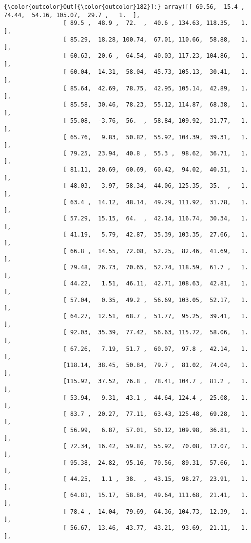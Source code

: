 \documentclass[11pt]{article}
\begin{document}
\begin{Verbatim}[commandchars=\\\{\}]
{\color{outcolor}Out[{\color{outcolor}182}]:} array([[ 69.56,  15.4 ,  74.44,  54.16, 105.07,  29.7 ,   1.  ],
                 [ 89.5 ,  48.9 ,  72.  ,  40.6 , 134.63, 118.35,   1.  ],
                 [ 85.29,  18.28, 100.74,  67.01, 110.66,  58.88,   1.  ],
                 [ 60.63,  20.6 ,  64.54,  40.03, 117.23, 104.86,   1.  ],
                 [ 60.04,  14.31,  58.04,  45.73, 105.13,  30.41,   1.  ],
                 [ 85.64,  42.69,  78.75,  42.95, 105.14,  42.89,   1.  ],
                 [ 85.58,  30.46,  78.23,  55.12, 114.87,  68.38,   1.  ],
                 [ 55.08,  -3.76,  56.  ,  58.84, 109.92,  31.77,   1.  ],
                 [ 65.76,   9.83,  50.82,  55.92, 104.39,  39.31,   1.  ],
                 [ 79.25,  23.94,  40.8 ,  55.3 ,  98.62,  36.71,   1.  ],
                 [ 81.11,  20.69,  60.69,  60.42,  94.02,  40.51,   1.  ],
                 [ 48.03,   3.97,  58.34,  44.06, 125.35,  35.  ,   1.  ],
                 [ 63.4 ,  14.12,  48.14,  49.29, 111.92,  31.78,   1.  ],
                 [ 57.29,  15.15,  64.  ,  42.14, 116.74,  30.34,   1.  ],
                 [ 41.19,   5.79,  42.87,  35.39, 103.35,  27.66,   1.  ],
                 [ 66.8 ,  14.55,  72.08,  52.25,  82.46,  41.69,   1.  ],
                 [ 79.48,  26.73,  70.65,  52.74, 118.59,  61.7 ,   1.  ],
                 [ 44.22,   1.51,  46.11,  42.71, 108.63,  42.81,   1.  ],
                 [ 57.04,   0.35,  49.2 ,  56.69, 103.05,  52.17,   1.  ],
                 [ 64.27,  12.51,  68.7 ,  51.77,  95.25,  39.41,   1.  ],
                 [ 92.03,  35.39,  77.42,  56.63, 115.72,  58.06,   1.  ],
                 [ 67.26,   7.19,  51.7 ,  60.07,  97.8 ,  42.14,   1.  ],
                 [118.14,  38.45,  50.84,  79.7 ,  81.02,  74.04,   1.  ],
                 [115.92,  37.52,  76.8 ,  78.41, 104.7 ,  81.2 ,   1.  ],
                 [ 53.94,   9.31,  43.1 ,  44.64, 124.4 ,  25.08,   1.  ],
                 [ 83.7 ,  20.27,  77.11,  63.43, 125.48,  69.28,   1.  ],
                 [ 56.99,   6.87,  57.01,  50.12, 109.98,  36.81,   1.  ],
                 [ 72.34,  16.42,  59.87,  55.92,  70.08,  12.07,   1.  ],
                 [ 95.38,  24.82,  95.16,  70.56,  89.31,  57.66,   1.  ],
                 [ 44.25,   1.1 ,  38.  ,  43.15,  98.27,  23.91,   1.  ],
                 [ 64.81,  15.17,  58.84,  49.64, 111.68,  21.41,   1.  ],
                 [ 78.4 ,  14.04,  79.69,  64.36, 104.73,  12.39,   1.  ],
                 [ 56.67,  13.46,  43.77,  43.21,  93.69,  21.11,   1.  ],

\end{Verbatim}
\end{document}
